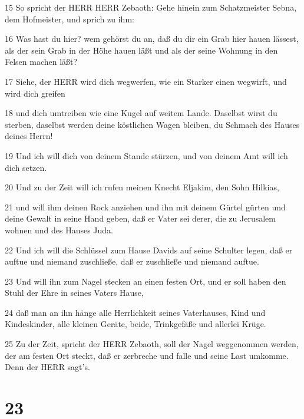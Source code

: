 \par 15 So spricht der HERR HERR Zebaoth: Gehe hinein zum Schatzmeister Sebna, dem Hofmeister, und sprich zu ihm:
\par 16 Was hast du hier? wem gehörst du an, daß du dir ein Grab hier hauen lässest, als der sein Grab in der Höhe hauen läßt und als der seine Wohnung in den Felsen machen läßt?
\par 17 Siehe, der HERR wird dich wegwerfen, wie ein Starker einen wegwirft, und wird dich greifen
\par 18 und dich umtreiben wie eine Kugel auf weitem Lande. Daselbst wirst du sterben, daselbst werden deine köstlichen Wagen bleiben, du Schmach des Hauses deines Herrn!
\par 19 Und ich will dich von deinem Stande stürzen, und von deinem Amt will ich dich setzen.
\par 20 Und zu der Zeit will ich rufen meinen Knecht Eljakim, den Sohn Hilkias,
\par 21 und will ihm deinen Rock anziehen und ihn mit deinem Gürtel gürten und deine Gewalt in seine Hand geben, daß er Vater sei derer, die zu Jerusalem wohnen und des Hauses Juda.
\par 22 Und ich will die Schlüssel zum Hause Davids auf seine Schulter legen, daß er auftue und niemand zuschließe, daß er zuschließe und niemand auftue.
\par 23 Und will ihn zum Nagel stecken an einen festen Ort, und er soll haben den Stuhl der Ehre in seines Vaters Hause,
\par 24 daß man an ihn hänge alle Herrlichkeit seines Vaterhauses, Kind und Kindeskinder, alle kleinen Geräte, beide, Trinkgefäße und allerlei Krüge.
\par 25 Zu der Zeit, spricht der HERR Zebaoth, soll der Nagel weggenommen werden, der am festen Ort steckt, daß er zerbreche und falle und seine Last umkomme. Denn der HERR sagt's.

\chapter{23}

